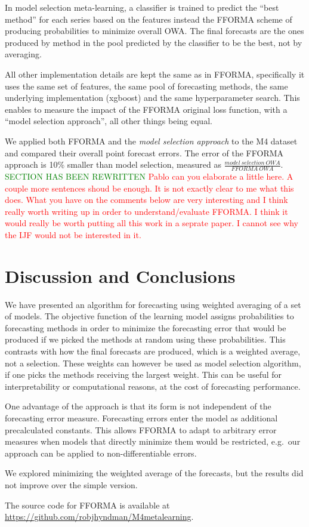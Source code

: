 \documentclass[11pt,a4paper,]{article}
\theoremstyle{definition}
\theoremstyle{definition}
\theoremstyle{definition}
\theoremstyle{remark}
\begin{document}
In model selection meta-learning, a classifier is trained to predict the
``best method'' for each series based on the features instead the FFORMA
scheme of producing probabilities to minimize overall OWA. The final
forecasts are the ones produced by method in the pool predicted by the
classifier to be the best, not by averaging.

All other implementation details are kept the same as in FFORMA,
specifically it uses the same set of features, the same pool of
forecasting methods, the same underlying implementation (xgboost) and
the same hyperparameter search. This enables to measure the impact of
the FFORMA original loss function, with a ``model selection approach'',
all other things being equal.

We applied both FFORMA and the \emph{model selection approach} to the M4
dataset and compared their overall point forecast errors. The error of
the FFORMA approach is 10\% smaller than model selection, measured as
\(\frac{model\ selection\ OWA}{FFORMA \ OWA}\).
\textcolor{green}{SECTION HAS BEEN REWRITTEN}
\textcolor{red}{Pablo can you elaborate a little here. A couple more sentences shoud be enough. It is not exactly clear to me what this does. What you have on the comments below are very interesting and I think really worth writing up in order to understand/evaluate FFORMA. I think it would really be worth putting all this work in a seprate paper. I cannot see why the IJF would not be interested in it.}

\section{Discussion and Conclusions}\label{conclusion}

We have presented an algorithm for forecasting using weighted averaging
of a set of models. The objective function of the learning model assigns
probabilities to forecasting methods in order to minimize the
forecasting error that would be produced if we picked the methods at
random using these probabilities. This contrasts with how the final
forecasts are produced, which is a weighted average, not a selection.
These weights can however be used as model selection algorithm, if one
picks the methods receiving the largest weight. This can be useful for
interpretability or computational reasons, at the cost of forecasting
performance.

One advantage of the approach is that its form is not independent of the
forecasting error measure. Forecasting errors enter the model as
additional precalculated constants. This allows FFORMA to adapt to
arbitrary error measures when models that directly minimize them would
be restricted, e.g.~our approach can be applied to non-differentiable
errors.

We explored minimizing the weighted average of the forecasts, but the
results did not improve over the simple version.

The source code for FFORMA is available at
\url{https://github.com/robjhyndman/M4metalearning}.

\printbibliography[title=References]
\end{document}
